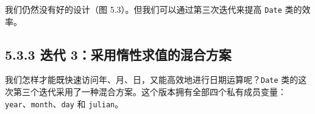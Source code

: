 
我们仍然没有好的设计（图 5.3）。但我们可以通过第三次迭代来提高 \texttt{Date} 类的效率。


\subsection{5.3.3 迭代 3：采用惰性求值的混合方案}

我们怎样才能既快速访问年、月、日，又能高效地进行日期运算呢？\texttt{Date} 类的这次第三个迭代采用了一种混合方案。这个版本拥有全部四个私有成员变量：\texttt{year}、\texttt{month}、\texttt{day} 和 \texttt{julian}。

